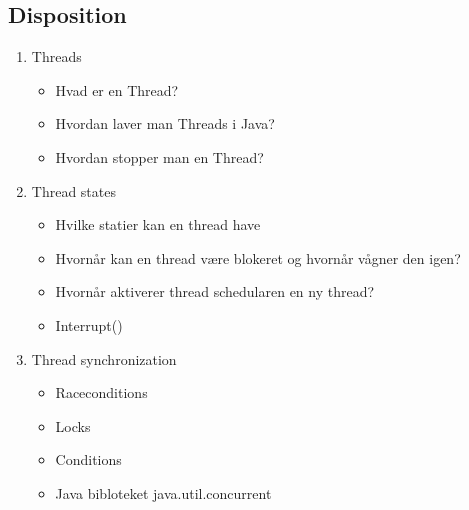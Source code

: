 \documentclass{article}
\begin{document}
\subsection{Disposition}	
\begin{enumerate}
	\item Threads
	\begin{itemize}
		\item Hvad er en Thread?
		\item Hvordan laver man Threads i Java?
		\item Hvordan stopper man en Thread?
	\end{itemize}
	\item Thread states 
	\begin{itemize}
		\item Hvilke statier kan en thread have
		\item Hvornår kan en thread være blokeret og hvornår vågner den igen?
		\item Hvornår aktiverer thread schedularen en ny thread?
		\item Interrupt()
	\end{itemize}
	\item Thread synchronization
	\begin{itemize}
		\item Raceconditions 
		\item Locks
		\item Conditions
		\item Java bibloteket java.util.concurrent
	\end{itemize} 
\end{enumerate}
\end{document}
